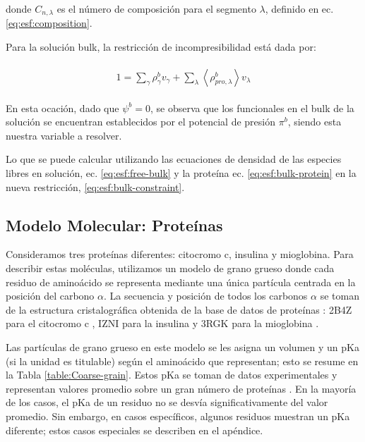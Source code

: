 donde $C_{n,\lambda}$ es el n\'umero de composici\'on para el segmento $\lambda$, definido en ec.  \ref{eq:esf:composition}.

Para la soluci\'on bulk, la restricci\'on de incompresibilidad est\'a dada por:

\begin{align}
	\begin{aligned}
		1= {\sum_{\gamma}\rho^b_\gamma v_\gamma + \sum_\lambda{\left<\rho^b_{pro,\lambda}\right>v_\lambda} }
	\end{aligned}
	\label{eq:esf:bulk-constraint}
\end{align}


En esta ocaci\'on, dado que $\psi^b = 0$, se observa que los funcionales en el bulk de la soluci\'on se encuentran establecidos por el potencial de presi\'on $\pi^b$, siendo esta nuestra variable a resolver.

Lo que se puede calcular utilizando las ecuaciones de densidad de las especies libres en soluci\'on, ec.  \ref{eq:esf:free-bulk} y la prote\'ina ec. \ref{eq:esf:bulk-protein} en la nueva restricci\'on, \ref{eq:esf:bulk-constraint}.



\subsection{Modelo Molecular: Prote\'inas}%



Consideramos tres prote\'inas diferentes: citocromo c, insulina y mioglobina.
Para describir estas mol\'eculas, utilizamos un modelo de grano grueso donde cada residuo de amino\'acido se representa mediante una \'unica part\'icula centrada en la posici\'on del carbono $\alpha$.
La secuencia y posici\'on de todos los carbonos $\alpha$ se toman de la estructura cristalogr\'afica obtenida de la base de datos de prote\'inas \cite{berman2000protein}: 2B4Z para el citocromo c \cite{mirkin2008high}, IZNI para la insulina \cite{bentley1976structure} y 3RGK para la mioglobina \cite{hubbard1990x}.

Las part\'iculas de grano grueso en este modelo se les asigna un volumen y un pKa (si la unidad es titulable) seg\'un el amino\'acido que representan; esto se resume en la Tabla \ref{table:Coarse-grain}.
Estos pKa se toman de datos experimentales y representan valores promedio sobre un gran n\'umero de proteínas \cite{grimsley2009summary}.
En la mayor\'ia de los casos, el pKa de un residuo no se desv\'ia significativamente del valor promedio.
Sin embargo, en casos espec\'ificos, algunos residuos muestran un pKa diferente;
estos casos especiales se describen en el ap\'endice. 





